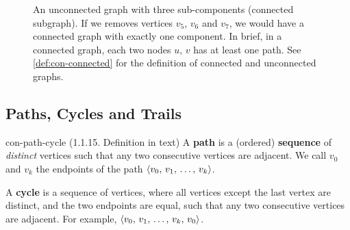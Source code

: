 \documentclass[../src/handouts/main.tex]{subfiles}
\begin{document}

\begin{figure}[ht]
  \centering
  \caption{An unconnected graph with three sub-components (connected subgraph). If we removes vertices $v_5$, $v_6$ and $v_7$, we would have a connected graph with exactly one component. In brief, in a connected graph, each two nodes $u,\, v$ has at least one path. See \cref{def:con-connected} for the definition of connected and unconnected graphs.}
  \label{fig:con-connected-graph-interlude}
\end{figure}

\subsection{Paths, Cycles and Trails}\label{subsec:con-path}

\begin{definition}{}{con-path-cycle}
  (1.1.15. Definition in text)
  A \textbf{path} is a (ordered) \textbf{sequence} of \textit{distinct} vertices such that any two consecutive vertices are adjacent. We call $v_0$ and $v_k$ the endpoints of the path $\langle v_0,\, v_1,\, \ldots,\, v_k\rangle$.

  A \textbf{cycle} is a sequence of vertices, where all vertices except the last vertex are distinct, and the two endpoints are equal, such that any two consecutive vertices are adjacent. For example, $\langle v_0,\, v_1,\, \ldots,\, v_k,\, v_0\rangle$.
\end{definition}
\end{document}
